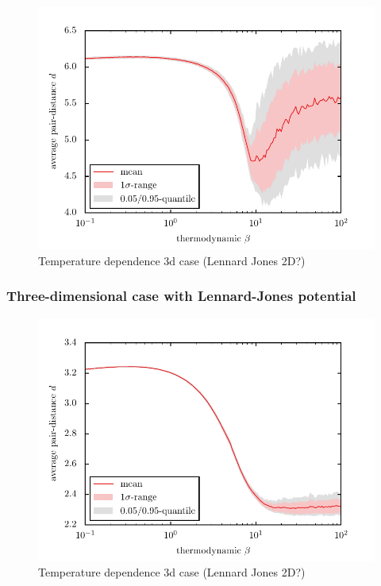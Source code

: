 \documentclass[11pt, a4paper]{article}
\numberwithin{equation}{section}
\newcommand{\remark}[1]{{\color{red}(#1)}}
\begin{document}
\begin{figure}
	\centering
	\includegraphics{./figures/temp_dep_lennard_jones2d.pdf}
	\caption{Temperature dependence 3d case \remark{Lennard Jones 2D?}}
	\label{Fig:Temp_dep_LJ2D}
\end{figure}



\subsubsection{Three-dimensional case with Lennard-Jones potential}
\begin{figure}
	\centering
	\includegraphics{./figures/temp_dep_lennard_jones3d.pdf}
	\caption{Temperature dependence 3d case \remark{Lennard Jones 2D?}}
	\label{Fig:Temp_dep_LJ3D}
\end{figure}
\end{document}
